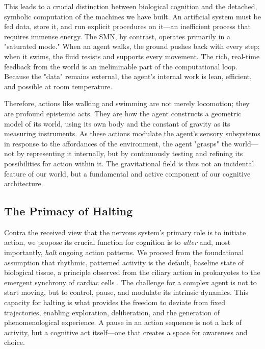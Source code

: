 This leads to a crucial distinction between biological cognition and the detached, symbolic computation of the machines we have built. An artificial system must be fed data, store it, and run explicit procedures on it—an inefficient process that requires immense energy. The SMN, by contrast, operates primarily in a "saturated mode." When an agent walks, the ground pushes back with every step; when it swims, the fluid resists and supports every movement. The rich, real-time feedback from the world is an ineliminable part of the computational loop. Because the "data" remains external, the agent's internal work is lean, efficient, and possible at room temperature.

Therefore, actions like walking and swimming are not merely locomotion; they are profound epistemic acts. They are how the agent constructs a geometric model of its world, using its own body and the constant of gravity as its measuring instruments. As these actions modulate the agent's sensory subsystems in response to the affordances of the environment, the agent "grasps" the world—not by representing it internally, but by continuously testing and refining its possibilities for action within it. The gravitational field is thus not an incidental feature of our world, but a fundamental and active component of our cognitive architecture.

\subsection{The Primacy of Halting}
\label{subsec:halting}
Contra the received view that the nervous system's primary role is to initiate action, we propose its crucial function for cognition is to \textit{alter} and, most importantly, \textit{halt} ongoing action patterns. We proceed from the foundational assumption that rhythmic, patterned activity is the default, baseline state of biological tissue, a principle observed from the ciliary action in prokaryotes to the emergent synchrony of cardiac cells \cite{landecker2007culturing}. The challenge for a complex agent is not to start moving, but to control, pause, and modulate its intrinsic dynamics. This capacity for halting is what provides the freedom to deviate from fixed trajectories, enabling exploration, deliberation, and the generation of phenomenological experience. A pause in an action sequence is not a lack of activity, but a cognitive act itself—one that creates a space for awareness and choice.

